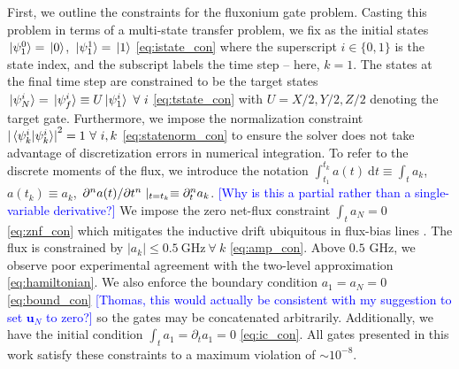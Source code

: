 First, we outline the constraints for the fluxonium gate problem.
Casting this problem in terms of a multi-state transfer problem, we fix as the initial states
 $\ket*{\psi^{0}_{1}} = \ket*{0}$, $\ket*{\psi^{1}_{1}} = \ket*{1}$
\eqref{eq:istate_con}
where the superscript $i \in \{0, 1\}$ is the state index,
and the subscript labels the time step -- here, $k = 1$.
The states at the final time step are constrained to be
the target states $\ket*{\psi^{i}_{N}} = \ket*{\psi^{i}_{f}} \equiv
U \ket*{\psi^{i}_{1}} \ \forall \ i$
\eqref{eq:tstate_con} with $U = X/2, Y/2, Z/2$ denoting the target gate.
Furthermore, we impose the normalization constraint
${\lvert \braket*{\psi^{i}_{k}}{\psi^{i}_{k}} \rvert}^{2} = 1 \ \forall \ i,k$
\eqref{eq:statenorm_con}
to ensure the solver does not take advantage of discretization errors in numerical integration.
To refer to the discrete moments of the flux, we introduce the notation
$\int^{t_{k}}_{t_{1}} a(t) \ \mathrm{d}t \equiv \int_{t} a_{k}$,
$a(t_{k}) \equiv a_{k}$,
$\pdv*[n]{a(t)}{t} \lvert_{t = t_{k}} \equiv \partial^{n}_{t} a_{k}$. \textcolor{blue}{[Why is this a partial rather than a single-variable derivative?]}
We impose the zero net-flux constraint $\int_{t} a_{N} = 0$
\eqref{eq:znf_con}
which mitigates the inductive drift ubiquitous in flux-bias lines
\cite{battistel2019fast, krantz2019quantum, zhang2020universal}.
The flux is constrained by $\lvert a_{k} \rvert \leq 0.5 \ \textrm{GHz} \ \forall \ k$
\eqref{eq:amp_con}.
Above $0.5$ GHz, we observe poor experimental agreement with the two-level approximation \eqref{eq:hamiltonian}.
We also enforce the boundary condition $a_{1} = a_{N} = 0$ \eqref{eq:bound_con} \textcolor{blue}{[Thomas, this would actually be consistent with my suggestion to set $\mathbf{u}_N$ to zero?]}
so the gates may be concatenated arbitrarily. Additionally,
we have the initial condition $\int_{t} a_{1} = \partial_{t} a_{1} = 0$
\eqref{eq:ic_con}. All gates presented in this work satisfy these constraints to
a maximum violation of $\sim 10^{-8}$.

